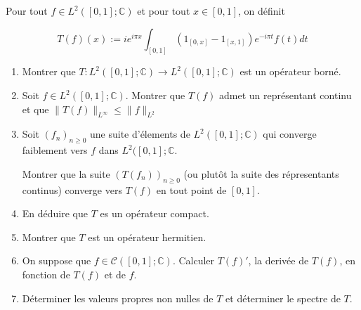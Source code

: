 \documentclass[10pt,a4paper,oneside]{article}
\newenvironment{exercice}[1][Exercice]{\begin{trivlist}
\item[\hskip \labelsep {\bfseries #1}]}{\end{trivlist}}
\newenvironment{solution}[1][Solution]{\begin{trivlist}
\item[\hskip \labelsep {\bfseries #1}]}{\end{trivlist}}
\begin{document}
\begin{exercice}
Pour tout $f \in L^2([0,1];\mathbb{C})$ et pour tout $x \in [0,1]$, on définit

\[ T(f)(x) := ie^{i \pi x} \int_{[0,1]} (1_{[0,x]} - 1_{[x,1]}) e^{-i \pi t} f(t) dt \]

\begin{enumerate}
\item
Montrer que $T: L^2([0,1];\mathbb{C}) \to L^2([0,1];\mathbb{C})$ est un opérateur borné.

\item
Soit $f \in L^2([0,1];\mathbb{C})$. Montrer que $T(f)$ admet un représentant continu et que $\| T(f) \|_{L^{\infty}} \leq \| f \|_{L^2}$

\item
Soit $(f_n)_{n \geq 0}$ une suite d'élements de $L^2([0,1];\mathbb{C})$ qui converge faiblement vers $f$ dans $L^2([0,1];\mathbb{C}$.

Montrer que la suite $(T(f_n))_{n \geq 0}$ (ou plutôt la suite des répresentants continus) converge vers $T(f)$ en tout point de $[0,1]$.

\item
En déduire que $T$ es un opérateur compact.

\item
Montrer que $T$ est un opérateur hermitien.

\item
On suppose que $f \in \mathscr{C}([0,1];\mathbb{C})$. Calculer $T(f)'$, la derivée de $T(f)$, en fonction de $T(f)$ et de $f$.

\item
Déterminer les valeurs propres non nulles de $T$ et déterminer le spectre de $T$.
\end{enumerate}
\end{exercice}

\begin{solution}
\end{solution}
\end{document}

